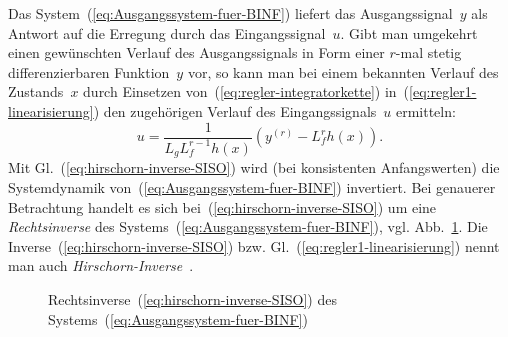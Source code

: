 \begin{remark}
\label{rem:Hirschorn-Inverse}Das System~(\ref{eq:Ausgangssystem-fuer-BINF})
liefert das Ausgangssignal~$y$ als Antwort auf die Erregung durch
das Eingangssignal~$u$. Gibt man umgekehrt einen gewünschten Verlauf
des Ausgangssignals in Form einer $r$-mal stetig differenzierbaren
Funktion~$y$ vor, so kann man bei einem bekannten Verlauf des Zustands~$x$
durch Einsetzen von~(\ref{eq:regler-integratorkette}) in~(\ref{eq:regler1-linearisierung})
den zugehörigen Verlauf des Eingangssignals~$u$ ermitteln: 
\begin{equation}
u=\frac{1}{L_{g}L_{f}^{r-1}h(x)}\left(y^{(r)}-L_{f}^{r}h(x)\right).\label{eq:hirschorn-inverse-SISO}
\end{equation}
Mit Gl.~(\ref{eq:hirschorn-inverse-SISO}) wird (bei konsistenten
Anfangswerten) die Systemdynamik von~(\ref{eq:Ausgangssystem-fuer-BINF})
invertiert. Bei genauerer Betrachtung handelt es sich bei~(\ref{eq:hirschorn-inverse-SISO})
um eine \emph{Rechtsinverse} des Systems~(\ref{eq:Ausgangssystem-fuer-BINF}),
vgl. Abb.~\ref{fig:rechtsinverse-hirschon}. Die Inverse~(\ref{eq:hirschorn-inverse-SISO})
bzw. Gl.~(\ref{eq:regler1-linearisierung}) nennt man auch \emph{Hirschorn-Inverse}~\cite{hirschorn1979,daoutidis1991,henson1997chap3}.
\end{remark}
\begin{figure}
\begin{centering}
\resizebox{0.99\textwidth}{!}{}
\par\end{centering}
\caption{Rechtsinverse~(\ref{eq:hirschorn-inverse-SISO}) des Systems~(\ref{eq:Ausgangssystem-fuer-BINF})\label{fig:rechtsinverse-hirschon}}
\end{figure}

